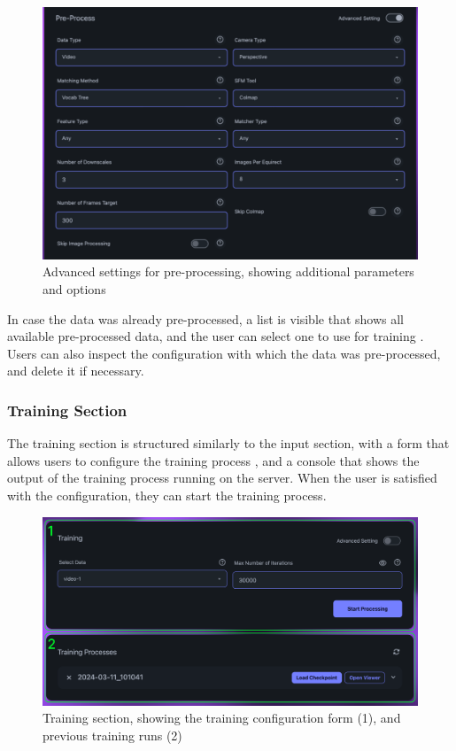 \begin{figure}[h!]
  \centering
  \includegraphics[width=.7\textwidth]{figures/view-extended-options.png}
  \caption{Advanced settings for pre-processing, showing additional parameters and options}
  \label{fig:design:advanced-settings}
\end{figure}

In case the data was already pre-processed, a list is visible that shows all available pre-processed data, and the user can select one to use for training .
Users can also inspect the configuration with which the data was pre-processed, and delete it if necessary.

\subsubsection*{Training Section}

The training section is structured similarly to the input section, with a form that allows users to configure the training process , and a console that shows the output of the training process running on the server.
When the user is satisfied with the configuration, they can start the training process.

\begin{figure}[h!]
  \centering
  \includegraphics[width=.7\textwidth]{figures/view-train.png}
  \caption{Training section, showing the training configuration form (1), and previous training runs (2)}
  \label{fig:design:training-section}
\end{figure}

